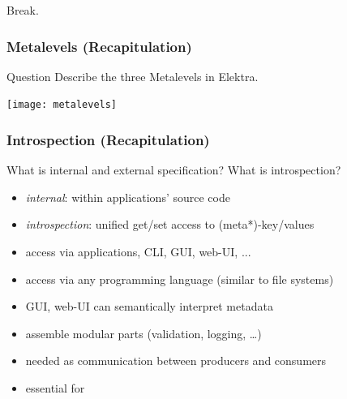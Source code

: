 \begin{assignment}
	\begin{task}
	Break.
	\end{task}
\end{assignment}


\begin{frame}
	\frametitle{Metalevels (Recapitulation)}
	\begin{alertblock}{Question}
	Describe the three Metalevels in Elektra.
	\end{alertblock}

	\pause
	\texttt{[image: metalevels]}
\end{frame}

\begin{frame}
	\frametitle{Introspection (Recapitulation)}
	\begin{task}
	What is internal and external specification?
	What is introspection?
	\end{task}

	\pause
	\vspace{1em}

	\begin{itemize}
	\item \textit{internal}: within applications' source code
	\item \textit{introspection}: unified get/set access to (meta*)-key/values
	\item access via applications, CLI, GUI, web-UI, ...
	\item access via any programming language (similar to file systems)
	\item GUI, web-UI can semantically interpret metadata
	\item assemble modular parts (validation, logging, \dots)
	\item needed as communication between producers and consumers
	\item essential for ~\citet{holland2001nofutz}
	\end{itemize}
\end{frame}

